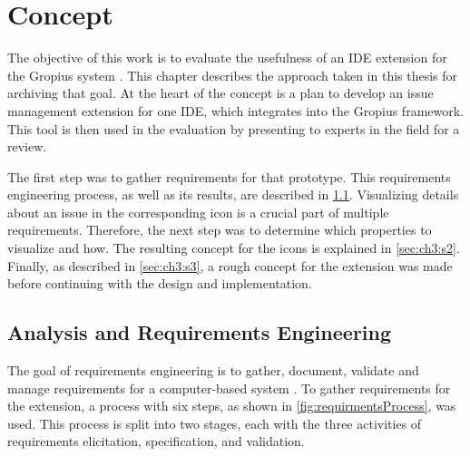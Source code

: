 
\chapter{Concept}
\label{chap:ch3}
The objective of this work is to evaluate the usefulness of an \gls{IDE} extension for the \gls{Gropius} system \cite{speth2020gropius}.
This chapter describes the approach taken in this thesis for archiving that goal.
At the heart of the concept is a plan to develop an issue management extension for one \gls{IDE},
which integrates into the  \gls{Gropius} framework.
This tool is then used in the evaluation by presenting to experts in the field for a review.

The first step was to gather requirements for that prototype. 
This requirements engineering process, as well as its results, are described in \cref{sec:ch3:s1}.
Visualizing details about an issue in the corresponding icon is a crucial part of multiple requirements.
Therefore, the next step was to determine which properties to visualize and how.
The resulting concept for the icons is explained in \cref{sec:ch3:s2}.
Finally, as described in \cref{sec:ch3:s3}, 
a rough concept for the extension was made before continuing with the design and implementation.

\section{Analysis and Requirements Engineering}
\label{sec:ch3:s1}
The goal of requirements engineering is to gather, document, validate and manage requirements for a computer-based system \cite{sommerville1997requirements}. 
To gather requirements for the extension, a process with six steps, as shown in \cref{fig:requirmentsProcess}, was used.
This process is split into two stages, each with the three activities of requirements elicitation, specification, and validation.

